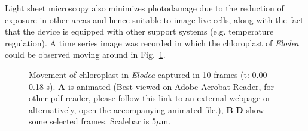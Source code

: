 Light sheet microscopy also minimizes photodamage due to the reduction of exposure in other areas and hence suitable to image live cells, along with the fact that the device is equipped with other support systems (e.g. temperature regulation). 
A time series image was recorded in which the chloroplast of \textit{Elodea} could be observed moving around in Fig.~\ref{fig:Elomov}. 
\\
\begin{figure}[h]
\centering
{}\hspace{0.1mm}
\hspace{0.1mm}
\hspace{0.1mm}
\caption{Movement of chloroplast in \textit{Elodea} captured in 10 frames (t: 0.00-0.18 s). 
\textbf{A} is animated (Best viewed on Adobe Acrobat Reader, for other pdf-reader, please follow this \href{https://i.imgur.com/MbgWUVP.mp4}{link to an external webpage} or alternatively, open the accompanying animated file.), \textbf{B}-\textbf{D} show some selected frames. 
Scalebar is 5$\mu$m.} 
\label{fig:Elomov}
\end{figure}


\renewcommand{\refname}{\spacedlowsmallcaps{References}} %

%


